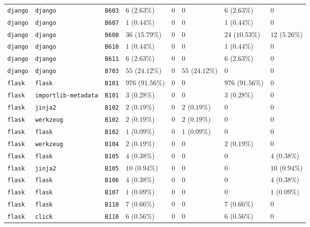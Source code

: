 \begin{table}
\begin{tabular}{llllllll}
\texttt{django} & \texttt{django} & \texttt{B603} & $6$ ($2.63\%$) & $0$ & $0$ & $6$ ($2.63\%$) & $0$ \\
\texttt{django} & \texttt{django} & \texttt{B607} & $1$ ($0.44\%$) & $0$ & $0$ & $1$ ($0.44\%$) & $0$ \\
\texttt{django} & \texttt{django} & \texttt{B608} & $36$ ($15.79\%$) & $0$ & $0$ & $24$ ($10.53\%$) & $12$ ($5.26\%$) \\
\texttt{django} & \texttt{django} & \texttt{B610} & $1$ ($0.44\%$) & $0$ & $0$ & $1$ ($0.44\%$) & $0$ \\
\texttt{django} & \texttt{django} & \texttt{B611} & $6$ ($2.63\%$) & $0$ & $0$ & $6$ ($2.63\%$) & $0$ \\
\texttt{django} & \texttt{django} & \texttt{B703} & $55$ ($24.12\%$) & $0$ & $55$ ($24.12\%$) & $0$ & $0$ \\
\texttt{flask} & \texttt{flask} & \texttt{B101} & $976$ ($91.56\%$) & $0$ & $0$ & $976$ ($91.56\%$) & $0$ \\
\texttt{flask} & \texttt{importlib-metadata} & \texttt{B101} & $3$ ($0.28\%$) & $0$ & $0$ & $3$ ($0.28\%$) & $0$ \\
\texttt{flask} & \texttt{jinja2} & \texttt{B102} & $2$ ($0.19\%$) & $0$ & $2$ ($0.19\%$) & $0$ & $0$ \\
\texttt{flask} & \texttt{werkzeug} & \texttt{B102} & $2$ ($0.19\%$) & $0$ & $2$ ($0.19\%$) & $0$ & $0$ \\
\texttt{flask} & \texttt{flask} & \texttt{B102} & $1$ ($0.09\%$) & $0$ & $1$ ($0.09\%$) & $0$ & $0$ \\
\texttt{flask} & \texttt{werkzeug} & \texttt{B104} & $2$ ($0.19\%$) & $0$ & $0$ & $2$ ($0.19\%$) & $0$ \\
\texttt{flask} & \texttt{flask} & \texttt{B105} & $4$ ($0.38\%$) & $0$ & $0$ & $0$ & $4$ ($0.38\%$) \\
\texttt{flask} & \texttt{jinja2} & \texttt{B105} & $10$ ($0.94\%$) & $0$ & $0$ & $0$ & $10$ ($0.94\%$) \\
\texttt{flask} & \texttt{flask} & \texttt{B106} & $4$ ($0.38\%$) & $0$ & $0$ & $0$ & $4$ ($0.38\%$) \\
\texttt{flask} & \texttt{flask} & \texttt{B107} & $1$ ($0.09\%$) & $0$ & $0$ & $0$ & $1$ ($0.09\%$) \\
\texttt{flask} & \texttt{flask} & \texttt{B110} & $7$ ($0.66\%$) & $0$ & $0$ & $7$ ($0.66\%$) & $0$ \\
\texttt{flask} & \texttt{click} & \texttt{B110} & $6$ ($0.56\%$) & $0$ & $0$ & $6$ ($0.56\%$) & $0$ \\

\end{tabular}
\end{table}
